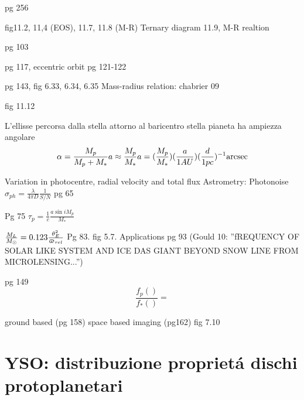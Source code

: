 pg 256 
\begin{workout}[M-R diagram]
fig11.2, 11,4 (EOS), 11.7, 11.8 (M-R)
Ternary diagram 11.9, M-R realtion
\end{workout}

pg 103
\begin{workout}
pg 117, eccentric orbit pg 121-122
\end{workout}
\begin{workout}
pg 143, fig 6.33, 6.34, 6.35
Mass-radius relation: chabrier 09
\end{workout}


\begin{workout}
fig 11.12
\end{workout}

\begin{workout}[Astrometry]
L'ellisse percorsa dalla stella attorno al baricentro stella pianeta ha ampiezza angolare
\begin{equation}
\alpha=\frac{M_p}{M_p+M_*}a\approx\frac{M_p}{M_*}a=(\frac{M_p}{M_*})(\frac{a}{1AU})(\frac{d}{1pc})\expy{-1}\si{\arcsec}
\end{equation}

Variation in photocentre, radial velocity and total flux
Astrometry: Photonoise $\sigma_{ph}=\frac{\lambda}{4\pi D}\frac{1}{S/N}$
pg 65

\end{workout}

\begin{workout}
Pg 75
$\tau_p=\frac{1}{c}\frac{a\sin{i}M_p}{M_*}$
\end{workout}

\begin{workout}[Microlensing]
$\frac{M_L}{\msun{}}=0.123\frac{\theta_E^2}{\upvarpi_{rel}}$
Pg 83. fig 5.7. Applications pg 93
(Gould 10: ''fREQUENCY OF SOLAR LIKE SYSTEM AND ICE DAS GIANT BEYOND SNOW LINE FROM MICROLENSING...'')
\end{workout}

\begin{workout}
pg 149
\begin{equation*}
\frac{f_p()}{f_*()}=
\end{equation*}
\end{workout}
\begin{workout}
ground based (pg 158) space based imaging (pg162)
fig 7.10
\end{workout}


{\let\clearpage\relax\let\cleardoublepage\relax
\chapter{YSO: distribuzione propriet\'a dischi protoplanetari}
}

